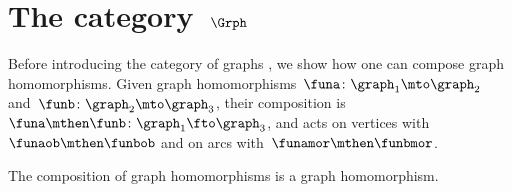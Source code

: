 
\section[The category~$\Grph$]{The category~$\Grph$}
\label{sec:cat-grph}

Before introducing the category of graphs \Grph, we show how one can compose graph homomorphisms.
Given graph homomorphisms~$\funa\colon \graph_1\mto \graph_2$ and~$\funb\colon \graph_2\mto \graph_3$, their composition is~$\funa\mthen \funb \colon \graph_1 \fto \graph_3$, and acts on vertices with~$\funaob \mthen \funbob$ and on arcs with~$\funamor \mthen \funbmor$.

\begin{lemma}
    \label{lem:composing_homomorphisms}
    The composition of graph homomorphisms is a graph homomorphism.
\end{lemma}
%
